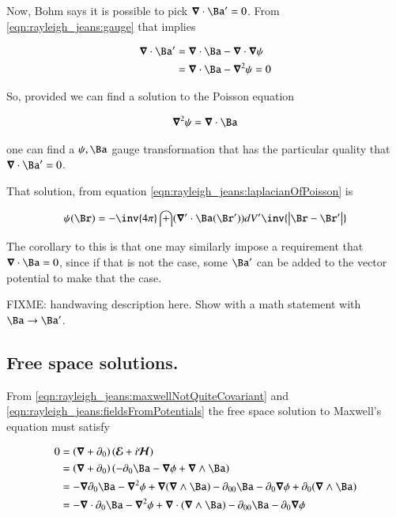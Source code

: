 Now, Bohm says it is possible to pick $\spacegrad \cdot \Ba' = 0$.  From \ref{eqn:rayleigh_jeans:gauge} that implies

\begin{align*}
\spacegrad \cdot \Ba'
&= \spacegrad \cdot \Ba - \spacegrad \cdot \spacegrad \psi \\
&= \spacegrad \cdot \Ba - \spacegrad^2 \psi = 0 \\
\end{align*}

So, provided we can find a solution to the Poisson equation

\begin{align}\label{eqn:rayleigh_jeans:psiForDivAPrimeEqZero}
\spacegrad^2 \psi = \spacegrad \cdot \Ba
\end{align}

one can find a $\psi, \Ba$ gauge transformation that has the particular quality that $\spacegrad \cdot \Ba' = 0$.

That solution, from equation \ref{eqn:rayleigh_jeans:laplacianOfPoisson} is

\begin{align*}
\psi(\Br) = -\inv{4\pi}\int (\spacegrad' \cdot \Ba(\Br')) dV' \inv{\Abs{\Br-\Br'}}
\end{align*}

The corollary to this
is that one may similarly impose a requirement that $\spacegrad \cdot \Ba = 0$, since if that is not the case, some $\Ba'$ can be added to the vector potential to make that the case.

FIXME: handwaving description here.  Show with a math statement with $\Ba \rightarrow \Ba'$.

\subsection{Free space solutions. }

From \ref{eqn:rayleigh_jeans:maxwellNotQuiteCovariant} and \ref{eqn:rayleigh_jeans:fieldsFromPotentials}
the free space solution to Maxwell's
equation must satisfy 

\begin{align*}
0 
&= \left(\spacegrad + \partial_0\right) (\EE + i\HH) \\
&= \left(\spacegrad + \partial_0\right) \left(- \partial_0{\Ba} - \spacegrad \phi + \spacegrad \wedge \Ba \right) \\
&= - \spacegrad \partial_0{\Ba} - \spacegrad^2 \phi + \spacegrad (\spacegrad \wedge \Ba) 
 - \partial_{00}{\Ba} - \partial_0 \spacegrad \phi + \partial_0 (\spacegrad \wedge \Ba) \\
&= - \spacegrad \cdot \partial_0{\Ba} - \spacegrad^2 \phi + \spacegrad \cdot (\spacegrad \wedge \Ba) 
 - \partial_{00}{\Ba} - \partial_0 \spacegrad \phi  \\
\end{align*}

